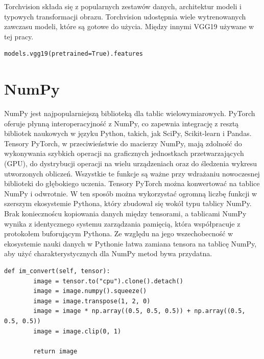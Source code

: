 \documentclass[openright]{xmgr}
\begin{document}
  \indent \indent Torchvision składa się z popularnych zestawów danych, architektur modeli i typowych transformacji obrazu. Torchvision udostępnia wiele wytrenowanych zawczasu modeli, które są gotowe do użycia. Między innymi VGG19 używane w tej pracy.
    
\begin{lstlisting}
models.vgg19(pretrained=True).features
\end{lstlisting}

  
\section{NumPy\label{s:dsssl}}
    
  \indent \indent NumPy jest najpopularniejszą biblioteką dla tablic wielowymiarowych. PyTorch oferuje płynną interoperacyjność z NumPy, co zapewnia integrację z resztą bibliotek naukowych w języku Python, takich, jak SciPy, Scikit-learn i Pandas. Tensory PyTorch, w przeciwieństwie do macierzy NumPy, mają zdolność do wykonywania szybkich operacji na graficznych jednostkach przetwarzających (GPU), do dystrybucji operacji na wielu urządzeniach oraz do śledzenia wykresu utworzonych obliczeń. Wszystkie te funkcje są ważne przy wdrażaniu nowoczesnej biblioteki do głębokiego uczenia. Tensory PyTorch można konwertować na tablice NumPy i odwrotnie. W ten sposób można wykorzystać ogromną liczbę funkcji w szerszym ekosystemie Pythona, który zbudował się wokół typu tablicy NumPy. Brak koniecznoścu kopiowania danych między tensorami, a tablicami NumPy wynika z identycznego systemu zarządzania pamięcią, która współpracuje z protokołem buforującym Pythona. 
Ze względu na jego wszechobecność w ekosystemie nauki danych w Pythonie łatwa zamiana tensora na tablicę NumPy, aby użyć charakterystycznych dla NumPy metod bywa przydatna.

\begin{lstlisting}
def im_convert(self, tensor):
        image = tensor.to("cpu").clone().detach()
        image = image.numpy().squeeze()
        image = image.transpose(1, 2, 0)
        image = image * np.array((0.5, 0.5, 0.5)) + np.array((0.5, 0.5, 0.5))
        image = image.clip(0, 1)

        return image
\end{lstlisting}

\clearpage
\end{document}
